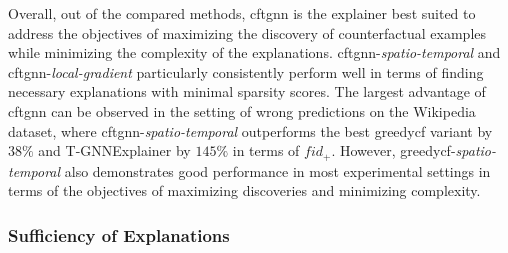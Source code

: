 Overall, out of the compared methods, \gls{cftgnn} is the explainer best suited to address the objectives of maximizing the discovery of counterfactual examples while minimizing the complexity of the explanations. \gls{cftgnn}-\textit{spatio-temporal} and \gls{cftgnn}-\textit{local-gradient} particularly consistently perform well in terms of finding necessary explanations with minimal sparsity scores. The largest advantage of \gls{cftgnn} can be observed in the setting of wrong predictions on the Wikipedia dataset, where \gls{cftgnn}-\textit{spatio-temporal} outperforms the best \gls{greedycf} variant by $38\%$ and T-GNNExplainer by $145\%$ in terms of $fid_+$. However, \gls{greedycf}-\textit{spatio-temporal} also demonstrates good performance in most experimental settings in terms of the objectives of maximizing discoveries and minimizing complexity.


\FloatBarrier

\subsubsection{Sufficiency of Explanations}
\label{s_Evaluation_Results_Sufficiency}


